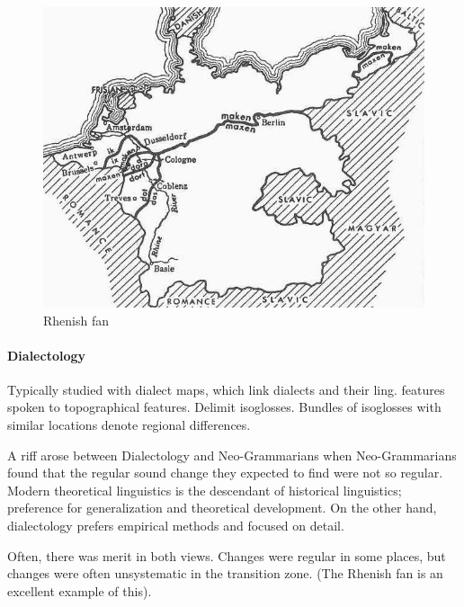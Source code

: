 \documentclass{exam}
\begin{document}
\begin{figure} [h!]
    \centering
    \includegraphics[scale=1.5]{rhenish_fan.jpg}
    \caption{Rhenish fan}
    \label{fig:my_label}
\end{figure}



\paragraph{Dialectology}Typically studied with dialect maps, which link dialects and their ling. features spoken to topographical features. Delimit isoglosses. Bundles of isoglosses with similar locations denote regional differences. 

A riff arose between Dialectology and Neo-Grammarians when Neo-Grammarians found that the regular sound change they expected to find were not so regular. Modern theoretical linguistics is the descendant of historical linguistics; preference for generalization and theoretical development. On the other hand, dialectology prefers empirical methods and focused on detail. 



Often, there was merit in both views. Changes were regular in some places, but changes were often unsystematic in the transition zone. (The Rhenish fan is an excellent example of this). 
\end{document}
